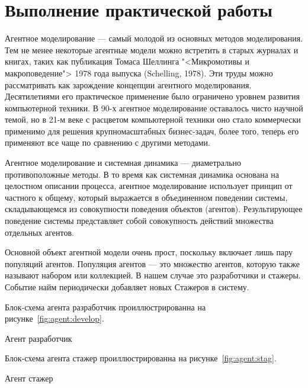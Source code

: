 \graphicspath{{./img}} %

\section*{Выполнение практической работы}
Агентное моделирование --- самый молодой из основных методов
моделирования. Тем не менее некоторые агентные модели можно
встретить в старых журналах и книгах, таких как публикация Томаса
Шеллинга "<Микромотивы и макроповедение"> 1978 года выпуска (Schelling,
1978). Эти труды можно рассматривать как зарождение концепции
агентного моделирования. Десятилетиями его практическое применение
было ограничено уровнем развития компьютерной техники. В 90-х агентное
моделирование оставалось чисто научной темой, но в 21-м веке с расцветом
компьютерной техники оно стало коммерчески применимо для решения
крупномасштабных бизнес-задач, более того, теперь его применяют все
чаще по сравнению с другими методами.\par
Агентное моделирование и системная динамика --- диаметрально
противоположные методы. В то время как системная динамика основана
на целостном описании процесса, агентное моделирование использует
принцип от частного к общему, который выражается в объединенном
поведении системы, складывающемся из совокупности поведения объектов
(агентов). Результирующее поведение системы представляет собой
совокупность действий множества отдельных агентов.\par
Основной объект агентной модели очень прост, поскольку включает лишь
пару популяций агентов. Популяция агентов --- это множество агентов,
которую также называют набором или коллекцией. В нашем случае
это разработчики и стажеры. Событие найм периодически добавляет
новых Стажеров в систему.\par
Блок-схема агента разработчик проиллюстрированна
на рисунке~\ref{fig:agent:develop}.

\begin{image}
	\caption{Агент разработчик}
	\label{fig:agent:develop}
\end{image}

Блок-схема агента стажер проиллюстрированна
на рисунке~\ref{fig:agent:stag}.

\begin{image}
	\caption{Агент стажер}
	\label{fig:agent:stag}
\end{image}

